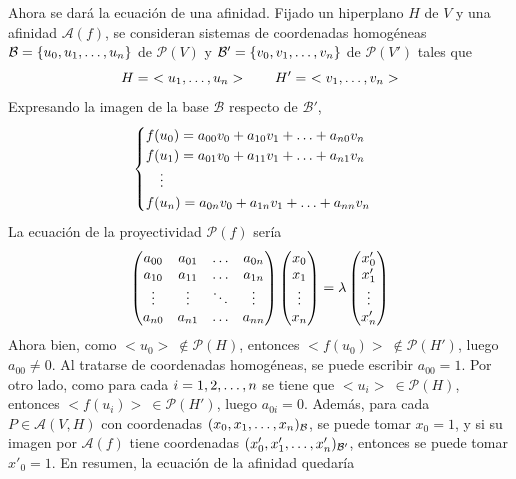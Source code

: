 \documentclass[12pt]{report}
\theoremstyle{definition}
\theoremstyle{definition}
\theoremstyle{remark}
\begin{document}
Ahora se dará la ecuación de una afinidad. Fijado un hiperplano $H$ de $V$ y una afinidad $\mathcal{A}(f)$, se consideran sistemas de coordenadas homogéneas $\mathcal{B} = \{u_0,u_1,\mathellipsis,u_n\}$ de $\mathcal{P}(V)$ y $\mathcal{B'} = \{v_0,v_1,\mathellipsis,v_n\}$ de $\mathcal{P}(V')$ tales que
\[H = \ <u_1,\mathellipsis,u_n> \qquad H' = \ <v_1,\mathellipsis,v_n>\]
Expresando la imagen de la base $\mathcal{B}$ respecto de $\mathcal{B'}$,
\[\begin{cases}
    f(u_0) = a_{00}v_0+a_{10}v_1+\mathellipsis+a_{n0}v_n\\
    f(u_1) = a_{01}v_0+a_{11}v_1+\mathellipsis+a_{n1}v_n\\
    \ \ \ \vdots \\
    f(u_n) = a_{0n}v_0+a_{1n}v_1+\mathellipsis+a_{nn}v_n
\end{cases}\]
La ecuación de la proyectividad $\mathcal{P}(f)$ sería
\[
\begin{pmatrix*}
    a_{00} & a_{01} & \mathellipsis & a_{0n} \\
    a_{10} & a_{11} & \mathellipsis & a_{1n} \\
    \vdots & \vdots & \ddots & \vdots \\
    a_{n0} & a_{n1} & \mathellipsis & a_{nn}
\end{pmatrix*} \begin{pmatrix*}
    x_0 \\
    x_1 \\
    \vdots \\
    x_n
\end{pmatrix*} = \lambda \begin{pmatrix*}
    x'_0 \\
    x'_1 \\
    \vdots \\
    x'_n
\end{pmatrix*}
\]
Ahora bien, como $<u_0> \ \notin \mathcal{P}(H)$, entonces $<f(u_0)> \ \notin \mathcal{P}(H')$, luego $a_{00} \neq 0$. Al tratarse de coordenadas homogéneas, se puede escribir $a_{00} = 1$. Por otro lado, como para cada $i = 1,2,\mathellipsis,n$ se tiene que $<u_i> \ \in \mathcal{P}(H)$, entonces $<f(u_i)> \ \in \mathcal{P}(H')$, luego $a_{0i} = 0$. Además, para cada $P \in \mathcal{A}(V,H)$ con coordenadas $(x_0,x_1,\mathellipsis,x_n)_{\mathcal{B}}$, se puede tomar $x_0 = 1$, y si su imagen por $\mathcal{A}(f)$ tiene coordenadas  $(x'_0,x'_1,\mathellipsis,x'_n)_{\mathcal{B'}}$, entonces se puede tomar $x'_0 = 1$. En resumen, la ecuación de la afinidad quedaría
\end{document}
